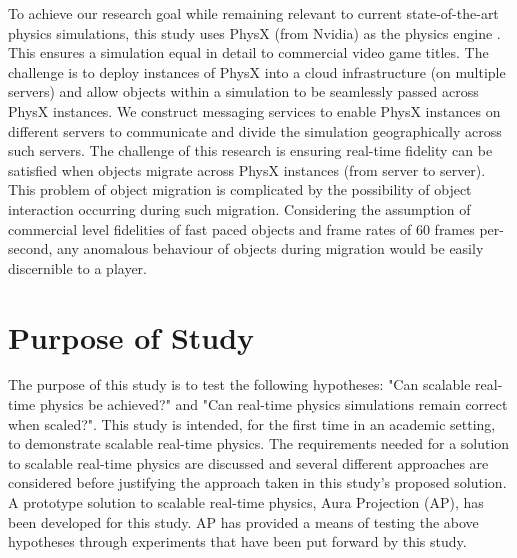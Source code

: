 To achieve our research goal while remaining relevant to current state-of-the-art physics simulations, this study uses PhysX (from Nvidia) as the physics engine \cite{PhysX}. This ensures a simulation equal in detail to commercial video game titles. The challenge is to deploy instances of PhysX into a cloud infrastructure (on multiple servers) and allow objects within a simulation to be seamlessly passed across PhysX instances. We construct messaging services to enable PhysX instances on different servers to communicate and divide the simulation geographically across such servers. The challenge of this research is ensuring real-time fidelity can be satisfied when objects migrate across PhysX instances (from server to server). This problem of object migration is complicated by the possibility of object interaction occurring during such migration. Considering the assumption of commercial level fidelities of fast paced objects and frame rates of 60 frames per-second, any anomalous behaviour of objects during migration would be easily discernible to a player. 


\section{Purpose of Study}
The purpose of this study is to test the following hypotheses: "Can scalable real-time physics be achieved?" and "Can real-time physics simulations remain correct when scaled?". This study is intended, for the first time in an academic setting, to demonstrate scalable real-time physics. 
The requirements needed for a solution to scalable real-time physics are discussed and several different approaches are considered before justifying the approach taken in this study's proposed solution. 
A prototype solution to scalable real-time physics, Aura Projection (AP), has been developed for this study. AP has provided a means of testing the above hypotheses through experiments that have been put forward by this study.

